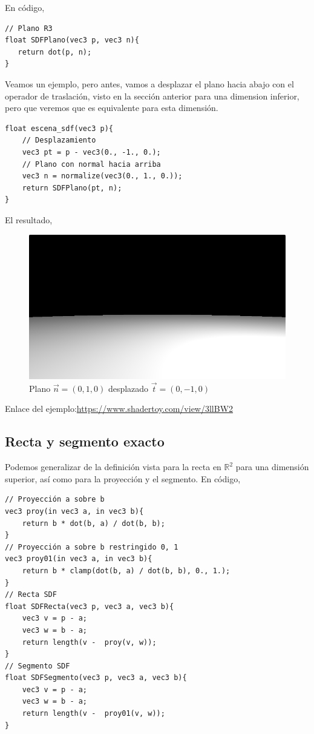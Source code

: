 En código,

\begin{lstlisting}
// Plano R3
float SDFPlano(vec3 p, vec3 n){
   return dot(p, n);
}
\end{lstlisting}

Veamos un ejemplo, pero antes, vamos a desplazar el plano hacia abajo con el operador de traslación, visto en la sección anterior para una dimension inferior, pero que veremos que es equivalente para esta dimensión.
\begin{lstlisting}
float escena_sdf(vec3 p){
    // Desplazamiento
    vec3 pt = p - vec3(0., -1., 0.);
    // Plano con normal hacia arriba
    vec3 n = normalize(vec3(0., 1., 0.));
    return SDFPlano(pt, n);
}
\end{lstlisting}

El resultado,

\begin{figure}[H]
  \centering
  \captionsetup{justification=centering}%
  \includegraphics[width=1.0\textwidth]{secciones/imagenes/sdf/3d/sdf_plano.png}
  \caption{Plano \(\Vec{n}=(0,1,0)\) desplazado \(\Vec{t}=(0, -1, 0)\)}
  \label{fig:plano}
\end{figure}

Enlace del ejemplo:\url{https://www.shadertoy.com/view/3llBW2}

\subsection{Recta y segmento exacto}

Podemos generalizar de la definición vista para la recta en \(\mathbb{R}^2\) para una dimensión superior, así como para la proyección y el segmento.
En código,
\begin{lstlisting}
// Proyección a sobre b
vec3 proy(in vec3 a, in vec3 b){
    return b * dot(b, a) / dot(b, b);
}
// Proyección a sobre b restringido 0, 1
vec3 proy01(in vec3 a, in vec3 b){
    return b * clamp(dot(b, a) / dot(b, b), 0., 1.);
}
// Recta SDF
float SDFRecta(vec3 p, vec3 a, vec3 b){
    vec3 v = p - a;
    vec3 w = b - a;
    return length(v -  proy(v, w));
}
// Segmento SDF
float SDFSegmento(vec3 p, vec3 a, vec3 b){
    vec3 v = p - a;
    vec3 w = b - a;
    return length(v -  proy01(v, w));
}
\end{lstlisting}

